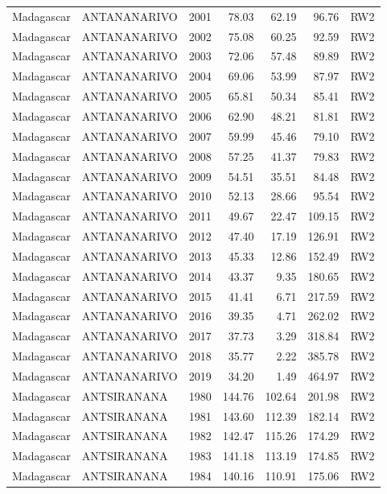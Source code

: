 \begin{longtable}{lllrrrl}
  Madagascar & ANTANANARIVO & 2001 & 78.03 & 62.19 & 96.76 & RW2 \\ 
  Madagascar & ANTANANARIVO & 2002 & 75.08 & 60.25 & 92.59 & RW2 \\ 
  Madagascar & ANTANANARIVO & 2003 & 72.06 & 57.48 & 89.89 & RW2 \\ 
  Madagascar & ANTANANARIVO & 2004 & 69.06 & 53.99 & 87.97 & RW2 \\ 
  Madagascar & ANTANANARIVO & 2005 & 65.81 & 50.34 & 85.41 & RW2 \\ 
  Madagascar & ANTANANARIVO & 2006 & 62.90 & 48.21 & 81.81 & RW2 \\ 
  Madagascar & ANTANANARIVO & 2007 & 59.99 & 45.46 & 79.10 & RW2 \\ 
  Madagascar & ANTANANARIVO & 2008 & 57.25 & 41.37 & 79.83 & RW2 \\ 
  Madagascar & ANTANANARIVO & 2009 & 54.51 & 35.51 & 84.48 & RW2 \\ 
  Madagascar & ANTANANARIVO & 2010 & 52.13 & 28.66 & 95.54 & RW2 \\ 
  Madagascar & ANTANANARIVO & 2011 & 49.67 & 22.47 & 109.15 & RW2 \\ 
  Madagascar & ANTANANARIVO & 2012 & 47.40 & 17.19 & 126.91 & RW2 \\ 
  Madagascar & ANTANANARIVO & 2013 & 45.33 & 12.86 & 152.49 & RW2 \\ 
  Madagascar & ANTANANARIVO & 2014 & 43.37 & 9.35 & 180.65 & RW2 \\ 
  Madagascar & ANTANANARIVO & 2015 & 41.41 & 6.71 & 217.59 & RW2 \\ 
  Madagascar & ANTANANARIVO & 2016 & 39.35 & 4.71 & 262.02 & RW2 \\ 
  Madagascar & ANTANANARIVO & 2017 & 37.73 & 3.29 & 318.84 & RW2 \\ 
  Madagascar & ANTANANARIVO & 2018 & 35.77 & 2.22 & 385.78 & RW2 \\ 
  Madagascar & ANTANANARIVO & 2019 & 34.20 & 1.49 & 464.97 & RW2 \\ 
  Madagascar & ANTSIRANANA & 1980 & 144.76 & 102.64 & 201.98 & RW2 \\ 
  Madagascar & ANTSIRANANA & 1981 & 143.60 & 112.39 & 182.14 & RW2 \\ 
  Madagascar & ANTSIRANANA & 1982 & 142.47 & 115.26 & 174.29 & RW2 \\ 
  Madagascar & ANTSIRANANA & 1983 & 141.18 & 113.19 & 174.85 & RW2 \\ 
  Madagascar & ANTSIRANANA & 1984 & 140.16 & 110.91 & 175.06 & RW2 \\ 

\end{longtable}

